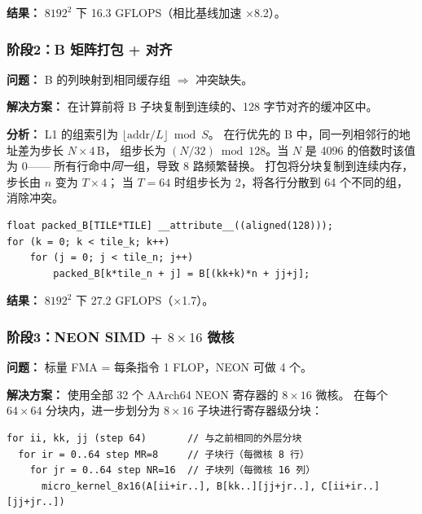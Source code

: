 \documentclass[11pt,a4paper]{article}
\begin{document}
\textbf{结果：} $8192^2$ 下 16.3 GFLOPS（相比基线加速 $\times$8.2）。

\subsubsection{阶段2：B 矩阵打包 + 对齐}

\textbf{问题：} B 的列映射到相同缓存组 $\Rightarrow$ 冲突缺失。

\textbf{解决方案：} 在计算前将 B 子块复制到连续的、128 字节对齐的缓冲区中。

\textbf{分析：}
L1 的组索引为 $\lfloor\text{addr}/L\rfloor \bmod S$。
在行优先的 B 中，同一列相邻行的地址差为步长 $N{\times}4$\,B，
组步长为 $(N/32)\bmod 128$。当 $N$ 是 4096 的倍数时该值为 0——
所有行命中\emph{同一}组，导致 8 路频繁替换。
打包将分块复制到连续内存，步长由 $n$ 变为 $T{\times}4$；
当 $T{=}64$ 时组步长为 2，将各行分散到 64 个不同的组，消除冲突。

\begin{lstlisting}[caption={B 矩阵打包}]
float packed_B[TILE*TILE] __attribute__((aligned(128)));
for (k = 0; k < tile_k; k++)
    for (j = 0; j < tile_n; j++)
        packed_B[k*tile_n + j] = B[(kk+k)*n + jj+j];
\end{lstlisting}

\textbf{结果：} $8192^2$ 下 27.2 GFLOPS（$\times$1.7）。

\subsubsection{阶段3：NEON SIMD + $8\times16$ 微核}

\textbf{问题：} 标量 FMA = 每条指令 1 FLOP，NEON 可做 4 个。

\textbf{解决方案：} 使用全部 32 个 AArch64 NEON 寄存器的 $8\times16$ 微核。
在每个 $64{\times}64$ 分块内，进一步划分为 $8{\times}16$ 子块进行寄存器级分块：
\begin{lstlisting}[language={},basicstyle=\ttfamily\scriptsize,frame=single,numbers=none]
for ii, kk, jj (step 64)       // 与之前相同的外层分块
  for ir = 0..64 step MR=8     // 子块行（每微核 8 行）
    for jr = 0..64 step NR=16  // 子块列（每微核 16 列）
      micro_kernel_8x16(A[ii+ir..], B[kk..][jj+jr..], C[ii+ir..][jj+jr..])
\end{lstlisting}
\end{document}
